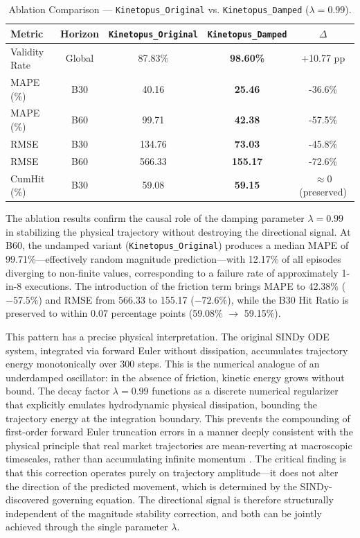 \documentclass[11pt,a4paper]{article}
\begin{document}
\begin{table}[H]
\centering
\small
\caption{Ablation Comparison --- \texttt{Kinetopus\_Original} vs. \texttt{Kinetopus\_Damped} ($\lambda = 0.99$).}
\label{tab:ablation_results}
\begin{tabular}{lcccc}
\toprule
\textbf{Metric} & \textbf{Horizon} & \textbf{\texttt{Kinetopus\_Original}} & \textbf{\texttt{Kinetopus\_Damped}} & \textbf{$\Delta$} \\
\midrule
Validity Rate & Global & 87.83\% & \textbf{98.60\%} & +10.77 pp \\
MAPE (\%) & B30 & 40.16 & \textbf{25.46} & -36.6\% \\
MAPE (\%) & B60 & 99.71 & \textbf{42.38} & -57.5\% \\
RMSE & B30 & 134.76 & \textbf{73.03} & -45.8\% \\
RMSE & B60 & 566.33 & \textbf{155.17} & -72.6\% \\
CumHit (\%) & B30 & 59.08 & \textbf{59.15} & $\approx 0$ (preserved) \\
\bottomrule
\end{tabular}
\end{table}

The ablation results confirm the causal role of the damping parameter $\lambda = 0.99$ in stabilizing the physical trajectory without destroying the directional signal. At B60, the undamped variant (\texttt{Kinetopus\_Original}) produces a median MAPE of 99.71\%---effectively random magnitude prediction---with 12.17\% of all episodes diverging to non-finite values, corresponding to a failure rate of approximately 1-in-8 executions. The introduction of the friction term brings MAPE to 42.38\% ($-57.5\%$) and RMSE from 566.33 to 155.17 ($-72.6\%$), while the B30 Hit Ratio is preserved to within 0.07 percentage points (59.08\% $\to$ 59.15\%).

This pattern has a precise physical interpretation. The original SINDy ODE system, integrated via forward Euler without dissipation, accumulates trajectory energy monotonically over 300 steps. This is the numerical analogue of an underdamped oscillator: in the absence of friction, kinetic energy grows without bound. The decay factor $\lambda = 0.99$ functions as a discrete numerical regularizer that explicitly emulates hydrodynamic physical dissipation, bounding the trajectory energy at the integration boundary. This prevents the compounding of first-order forward Euler truncation errors in a manner deeply consistent with the physical principle that real market trajectories are mean-reverting at macroscopic timescales, rather than accumulating infinite momentum \cite{kloeden1992numerical}. The critical finding is that this correction operates purely on trajectory amplitude---it does not alter the direction of the predicted movement, which is determined by the SINDy-discovered governing equation. The directional signal is therefore structurally independent of the magnitude stability correction, and both can be jointly achieved through the single parameter $\lambda$.
\end{document}
